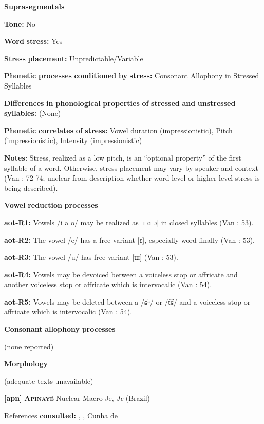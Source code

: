 \textbf{Suprasegmentals}

\textbf{Tone:} No

\textbf{Word} \textbf{stress:} Yes

\textbf{Stress} \textbf{placement:} Unpredictable/Variable

\textbf{Phonetic} \textbf{processes} \textbf{conditioned} \textbf{by} \textbf{stress:} Consonant Allophony in Stressed Syllables

\textbf{Differences} \textbf{in} \textbf{phonological} \textbf{properties} \textbf{of} \textbf{stressed} \textbf{and} \textbf{unstressed} \textbf{syllables:} (None)

\textbf{Phonetic} \textbf{correlates} \textbf{of} \textbf{stress:} Vowel duration (impressionistic), Pitch (impressionistic), Intensity (impressionistic)

\textbf{Notes:} Stress, realized as a low pitch, is an “optional property” of the first syllable of a word. Otherwise, stress placement may vary by speaker and context (Van \citealt{Breugel2008}: 72-74; unclear from description whether word-level or higher-level stress is being described).

\textbf{Vowel} \textbf{reduction} \textbf{processes}

\textbf{aot-R1:} Vowels /i a o/ may be realized as [ɪ ɑ ɔ] in closed syllables (Van \citealt{Breugel2008}: 53).

\textbf{aot-R2:} The vowel /e/ has a free variant [ɛ], especially word-finally (Van \citealt{Breugel2008}: 53).

\textbf{aot-R3:} The vowel /u/ has free variant [ɯ] (Van \citealt{Breugel2008}: 53).

\textbf{aot-R4:} Vowels may be devoiced between a voiceless stop or affricate and another voiceless stop or affricate which is intervocalic (Van \citealt{Breugel2008}: 54).

\textbf{aot-R5:} Vowels may be deleted between a /ɕʰ/ or /t͡ɕ/ and a voiceless stop or affricate which is intervocalic (Van \citealt{Breugel2008}: 54).

\textbf{Consonant} \textbf{allophony} \textbf{processes}

(none reported)

\textbf{Morphology}

(adequate texts unavailable)

\textbf{[apn]}   \textbf{\textsc{Apinayé}}  Nuclear-Macro-Je, \textit{Je} (Brazil)

References \textbf{consulted:} \citet{BurgessHam1968}, \citet{Ham2009}, Cunha de \citet{Oliveira2005}

